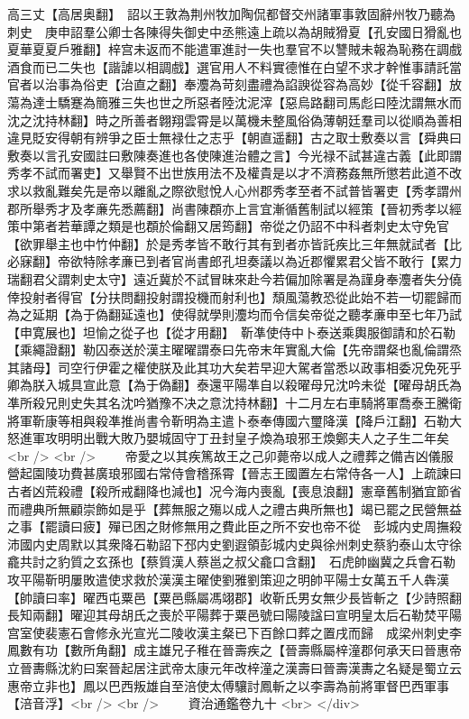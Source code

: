 高三丈【高居奥翻】　詔以王敦為荆州牧加陶侃都督交州諸軍事敦固辭州牧乃聽為刺史　庚申詔羣公卿士各陳得失御史中丞熊遠上疏以為胡賊猾夏【孔安國日猾亂也夏華夏夏戶雅翻】梓宫未返而不能遣軍進討一失也羣官不以讐賊未報為恥務在調戲酒食而已二失也【諧謔以相調戲】選官用人不料實德惟在白望不求才幹惟事請託當官者以治事為俗吏【治直之翻】奉灋為苛刻盡禮為諂諛從容為高妙【從千容翻】放蕩為達士驕蹇為簡雅三失也世之所惡者陸沈泥滓【惡烏路翻司馬彪曰陸沈謂無水而沈之沈持林翻】時之所善者翺翔雲霄是以萬機未整風俗偽薄朝廷羣司以從順為善相違見貶安得朝有辨爭之臣士無禄仕之志乎【朝直遥翻】古之取士敷奏以言【舜典曰敷奏以言孔安國註曰敷陳奏進也各使陳進治體之言】今光禄不試甚違古義【此即謂秀孝不試而署吏】又舉賢不出世族用法不及權貴是以才不濟務姦無所懲若此道不改求以救亂難矣先是帝以離亂之際欲慰悅人心州郡秀孝至者不試普皆署吏【秀孝謂州郡所舉秀才及孝亷先悉薦翻】尚書陳頵亦上言宜漸循舊制試以經策【晉初秀孝以經策中第者若華譚之類是也頵於倫翻又居筠翻】帝從之仍詔不中科者刺史太守免官【欲罪舉主也中竹仲翻】於是秀孝皆不敢行其有到者亦皆託疾比三年無就試者【比必寐翻】帝欲特除孝亷已到者官尚書郎孔坦奏議以為近郡懼累君父皆不敢行【累力瑞翻君父謂刺史太守】遠近冀於不試冒昧來赴今若偏加除署是為謹身奉灋者失分僥倖投射者得官【分扶問翻投射謂投機而射利也】頹風蕩教恐從此始不若一切罷歸而為之延期【為于偽翻延遠也】使得就學則灋均而令信矣帝從之聽孝亷申至七年乃試【申寛展也】坦愉之從子也【從才用翻】　靳凖使侍中卜泰送乘輿服御請和於石勒【乘繩證翻】勒囚泰送於漢主曜曜謂泰曰先帝末年實亂大倫【先帝謂粲也亂倫謂烝其諸母】司空行伊霍之權使朕及此其功大矣若早迎大駕者當悉以政事相委况免死乎卿為朕入城具宣此意【為于偽翻】泰還平陽凖自以殺曜母兄沈吟未從【曜母胡氏為凖所殺兄則史失其名沈吟猶豫不决之意沈持林翻】十二月左右車騎將軍喬泰王騰衛將軍靳康等相與殺凖推尚書令靳明為主遣卜泰奉傳國六璽降漢【降戶江翻】石勒大怒進軍攻明明出戰大敗乃嬰城固守丁丑封皇子煥為琅邪王煥鄭夫人之子生二年矣<br />
<br />
　　帝愛之以其疾篤故王之己卯薨帝以成人之禮葬之備吉凶儀服營起園陵功費甚廣琅邪國右常侍會稽孫霄【晉志王國置左右常侍各一人】上疏諫曰古者凶荒殺禮【殺所戒翻降也減也】况今海内喪亂【喪息浪翻】憲章舊制猶宜節省而禮典所無顧崇飾如是乎【葬無服之殤以成人之禮古典所無也】竭已罷之民營無益之事【罷讀曰疲】殫已困之財修無用之費此臣之所不安也帝不從　彭城内史周撫殺沛國内史周默以其衆降石勒詔下邳内史劉遐領彭城内史與徐州刺史蔡豹泰山太守徐龕共討之豹質之玄孫也【蔡質漢人蔡邕之叔父龕口含翻】　石虎帥幽冀之兵會石勒攻平陽靳明屢敗遣使求救於漢漢主曜使劉雅劉策迎之明帥平陽士女萬五千人犇漢【帥讀曰率】曜西屯粟邑【粟邑縣屬馮翊郡】收靳氏男女無少長皆斬之【少詩照翻長知兩翻】曜迎其母胡氏之喪於平陽葬于粟邑號曰陽陵諡曰宣明皇太后石勒焚平陽宫室使裴憲石會修永光宣光二陵收漢主粲已下百餘口葬之置戌而歸　成梁州刺史李鳳數有功【數所角翻】成主雄兄子稚在晉壽疾之【晉壽縣屬梓潼郡何承天曰晉惠帝立晉夀縣沈約曰案晉起居注武帝太康元年改梓潼之漢壽曰晉壽漢夀之名疑是蜀立云惠帝立非也】鳳以巴西叛雄自至涪使太傅驤討鳳斬之以李壽為前將軍督巴西軍事【涪音浮】<br />
<br />
　　資治通鑑卷九十  <br>
   </div> 

